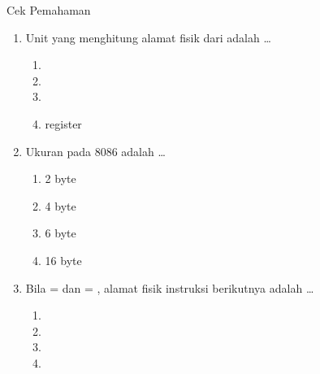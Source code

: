 \documentclass[aspectratio=169,11pt]{beamer}
\begin{document}
\begin{frame}{Cek Pemahaman}
\footnotesize
\begin{enumerate}
    \item Unit yang menghitung alamat fisik dari
           adalah \dots
          \begin{enumerate}
              \item {}
              \item {}
              \item {}
              \item register 
          \end{enumerate}

    \vspace{0.2em}
    \item Ukuran  pada 8086 adalah \dots
          \begin{enumerate}
              \item 2 byte \quad \item 4 byte \quad
              \item 6 byte \quad \item 16 byte
          \end{enumerate}

    \vspace{0.2em}
    \item Bila  =  dan  = ,
          alamat fisik instruksi berikutnya adalah \dots
          \begin{enumerate}
              \item {} \quad \item {} \quad
              \item {} \quad \item {}
          \end{enumerate}
\end{enumerate}
\end{frame}
\end{document}
